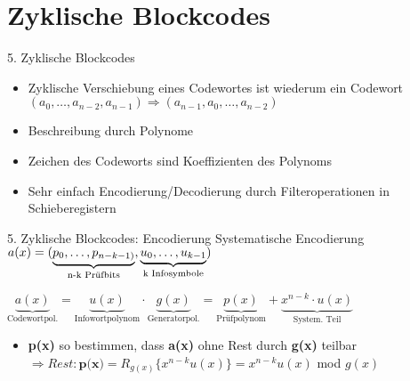 \documentclass[ngerman]{beamer}
\begin{document}
\section{Zyklische Blockcodes}
\begin{frame}{5. Zyklische Blockcodes}

	\begin{itemize}
		\item \alert{Zyklische Verschiebung} eines Codewortes ist wiederum ein Codewort\newline
		$ (a_{0},\dots,a_{n-2},a_{n-1}) \Rightarrow (a_{n-1},a_{0},\dots,a_{n-2})$\newline
		\item Beschreibung durch \alert{Polynome}
		\item Zeichen des Codeworts sind Koeffizienten des Polynoms\newline
		\item Sehr einfach Encodierung/Decodierung durch \alert{Filteroperationen} in Schieberegistern\newline

	\end{itemize}

\end{frame}


\begin{frame}{5. Zyklische Blockcodes: Encodierung}
	\alert{Systematische Encodierung}\newline
	$ a(x) = (\underbrace{p_{0}, \dots, p_{n-k-1)}}_\text{n-k Prüfbits}, \underbrace{u_{0}, \dots, u_{k-1}}_\text{k Infosymbole})\newline$

	 $\underbrace{a(x)}_\text{Codewortpol.} = \underbrace{u(x)}_\text{Infowortpolynom} \cdot \underbrace{g(x)}_\text{Generatorpol.} = \underbrace{p(x)}_\text{Prüfpolynom} + \underbrace{x^{n-k} \cdot u(x)}_\text{System. Teil}  $

\begin{itemize}
	\item \textbf{p(x)} so bestimmen, dass \textbf{a(x)} ohne Rest durch \textbf{g(x)} teilbar\newline\newline
	 $ \Rightarrow Rest: \textbf{p(x)} = R_{g(x)}\{x^{n-k} u(x)\} = x^{n-k} u(x)$ mod $g(x)$
\end{itemize}


\end{frame}
\end{document}
